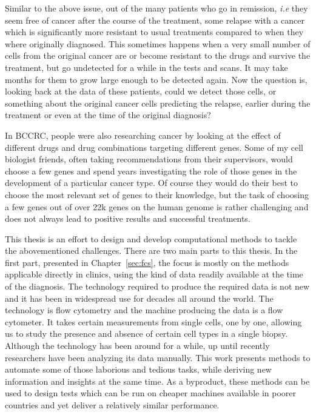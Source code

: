 Similar to the above issue, out of the many patients who go in remission,
\emph{i.e} they seem free of cancer after the course of the treatment, some
relapse with a cancer which is significantly more resistant to usual treatments
compared to when they where originally diagnosed. This sometimes happens when a
very small number of cells from the original cancer are or become resistant to
the drugs and survive the treatment, but go undetected for a while in the tests
and scans. It may take months for them to grow large enough to be detected
again. Now the question is, looking back at the data of these patients, could we
detect those cells, or something about the original cancer cells predicting the
relapse, earlier during the treatment or even at the time of the original
diagnosis?

In BCCRC, people were also researching cancer by looking at the effect of
different drugs and drug combinations targeting different genes. Some of my cell
biologist friends, often taking recommendations from their supervisors, would
choose a few genes and spend years investigating the role of those genes in the
development of a particular cancer type. Of course they would do their best to
choose the most relevant set of genes to their knowledge, but the task of
choosing a few genes out of over 22k genes on the human genome is rather
challenging and does not always lead to positive results and successful
treatments.

This thesis is an effort to design and develop computational methods to tackle
the abovementioned challenges. There are two main parts to this thesis. In the
first part, presented in Chapter~\ref{sec:fcs}, the focus is mostly on the
methods applicable directly in clinics, using the kind of data readily available
at the time of the diagnosis. The technology required to produce the required
data is not new and it has been in widespread use for decades all around the
world. The technology is flow cytometry and the machine producing the data is a
flow cytometer. It takes certain measurements from single cells, one by one,
allowing us to study the presence and absence of certain cell types in a single
biopsy. Although the technology has been around for a while, up until recently
researchers have been analyzing its data manually. This work presents methods to
automate some of those laborious and tedious tasks, while deriving new
information and insights at the same time. As a byproduct, these methods can be
used to design tests which can be run on cheaper machines available in poorer
countries and yet deliver a relatively similar performance.

